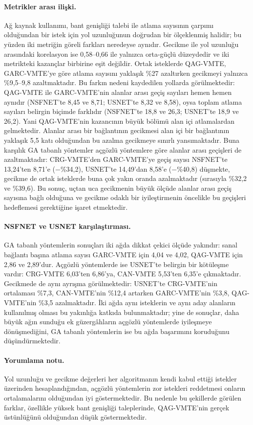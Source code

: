 \documentclass[10pt,twocolumn]{article}
\begin{document}
\paragraph{Metrikler arası ilişki.} Ağ kaynak kullanımı, bant genişliği talebi ile atlama sayısının çarpımı olduğundan bir istek için yol uzunluğunun doğrudan bir ölçeklenmiş halidir; bu yüzden iki metriğin göreli farkları neredeyse aynıdır. Gecikme ile yol uzunluğu arasındaki korelasyon ise 0,58--0,66 ile yalnızca orta-güçlü düzeydedir ve iki metrikteki kazançlar birbirine eşit değildir. Ortak isteklerde QAG-VMTE, GARC-VMTE'ye göre atlama sayısını yaklaşık \%27 azaltırken gecikmeyi yalnızca \%9,5--9,8 azaltmaktadır. Bu farkın nedeni kaydedilen yollarda görülmektedir: QAG-VMTE ile GARC-VMTE'nin alanlar arası geçiş sayıları hemen hemen aynıdır (NSFNET'te 8,45 ve 8,71; USNET'te 8,32 ve 8,58), oysa toplam atlama sayıları belirgin biçimde farklıdır (NSFNET'te 18,8 ve 26,3; USNET'te 18,9 ve 26,2). Yani QAG-VMTE'nin kazancının büyük bölümü alan içi atlamalardan gelmektedir. Alanlar arası bir bağlantının gecikmesi alan içi bir bağlantının yaklaşık 5,5 katı olduğundan bu azalma gecikmeye sınırlı yansımaktadır. Buna karşılık GA tabanlı yöntemler açgözlü yöntemlere göre alanlar arası geçişleri de azaltmaktadır: CRG-VMTE'den GARC-VMTE'ye geçiş sayısı NSFNET'te 13,24'ten 8,71'e ($-$\%34,2), USNET'te 14,49'dan 8,58'e ($-$\%40,8) düşmekte, gecikme de ortak isteklerde buna çok yakın oranda azalmaktadır (sırasıyla \%32,2 ve \%39,6). Bu sonuç, uçtan uca gecikmenin büyük ölçüde alanlar arası geçiş sayısına bağlı olduğuna ve gecikme odaklı bir iyileştirmenin öncelikle bu geçişleri hedeflemesi gerektiğine işaret etmektedir.

\paragraph{NSFNET ve USNET karşılaştırması.} GA tabanlı yöntemlerin sonuçları iki ağda dikkat çekici ölçüde yakındır: sanal bağlantı başına atlama sayısı GARC-VMTE için 4,04 ve 4,02, QAG-VMTE için 2,86 ve 2,89'dur. Açgözlü yöntemlerde ise USNET'te belirgin bir kötüleşme vardır: CRG-VMTE 6,03'ten 6,86'ya, CAN-VMTE 5,53'ten 6,35'e çıkmaktadır. Gecikmede de aynı ayrışma görülmektedir: USNET'te CRG-VMTE'nin ortalaması \%7,3, CAN-VMTE'nin \%12,4 artarken GARC-VMTE'nin \%3,8, QAG-VMTE'nin \%3,5 azalmaktadır. İki ağda aynı isteklerin ve aynı aday alanların kullanılmış olması bu yakınlığa katkıda bulunmaktadır; yine de sonuçlar, daha büyük ağın sunduğu ek güzergâhların açgözlü yöntemlerde iyileşmeye dönüşmediğini, GA tabanlı yöntemlerin ise bu ağda başarımını koruduğunu düşündürmektedir.

\paragraph{Yorumlama notu.} Yol uzunluğu ve gecikme değerleri her algoritmanın kendi kabul ettiği istekler üzerinden hesaplandığından, açgözlü yöntemlerin zor istekleri reddetmesi onların ortalamalarını olduğundan iyi göstermektedir. Bu nedenle bu şekillerde görülen farklar, özellikle yüksek bant genişliği taleplerinde, QAG-VMTE'nin gerçek üstünlüğünü olduğundan düşük göstermektedir.
\end{document}
